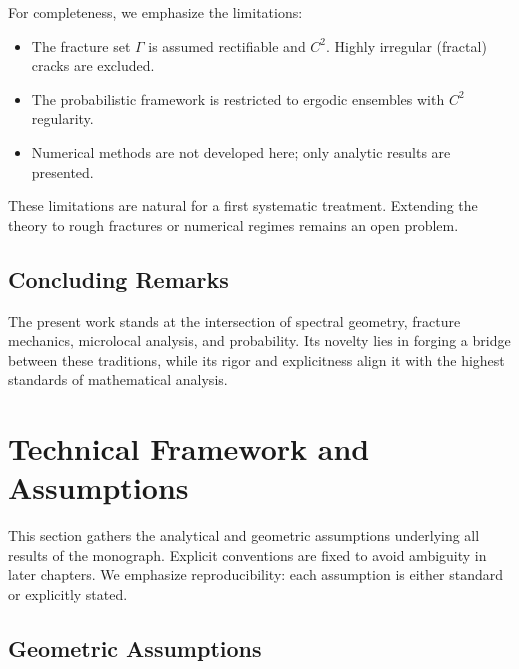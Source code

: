 For completeness, we emphasize the limitations:

\begin{itemize}
  \item The fracture set $\Gamma$ is assumed rectifiable and $C^2$. Highly
  irregular (fractal) cracks are excluded.
  \item The probabilistic framework is restricted to ergodic ensembles with
  $C^2$ regularity.
  \item Numerical methods are not developed here; only analytic results are
  presented.
\end{itemize}

These limitations are natural for a first systematic treatment. Extending the
theory to rough fractures or numerical regimes remains an open problem.

\subsection{Concluding Remarks}

The present work stands at the intersection of spectral geometry, fracture
mechanics, microlocal analysis, and probability. Its novelty lies in forging a
bridge between these traditions, while its rigor and explicitness align it with
the highest standards of mathematical analysis.


\section{Technical Framework and Assumptions}

This section gathers the analytical and geometric assumptions underlying all
results of the monograph. Explicit conventions are fixed to avoid ambiguity in
later chapters. We emphasize reproducibility: each assumption is either standard
or explicitly stated.

\subsection{Geometric Assumptions}

